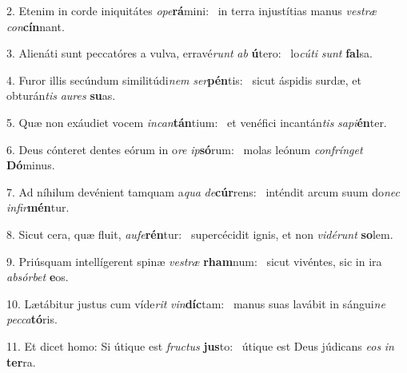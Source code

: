 2. Etenim in corde iniquitátes \textit{o}\textit{pe}\textbf{rá}mini: \ast\  in terra injustítias manus \textit{ves}\textit{træ} \textit{con}\textbf{cín}nant.\

3. Alienáti sunt peccatóres a vulva, erravé\textit{runt} \textit{ab} \textbf{ú}tero: \ast\  lo\textit{cú}\textit{ti} \textit{sunt} \textbf{fal}sa.\

4. Furor illis secúndum similitúdi\textit{nem} \textit{ser}\textbf{pén}tis: \ast\  sicut áspidis surdæ, et obturán\textit{tis} \textit{au}\textit{res} \textbf{su}as.\

5. Quæ non exáudiet vocem \textit{in}\textit{can}\textbf{tán}tium: \ast\  et venéfici incantán\textit{tis} \textit{sa}\textit{pi}\textbf{én}ter.\

6. Deus cónteret dentes eórum in o\textit{re} \textit{ip}\textbf{só}rum: \ast\  molas leónum \textit{con}\textit{frín}\textit{get} \textbf{Dó}minus.\

7. Ad níhilum devénient tamquam a\textit{qua} \textit{de}\textbf{cúr}rens: \ast\  inténdit arcum suum do\textit{nec} \textit{in}\textit{fir}\textbf{mén}tur.\

8. Sicut cera, quæ fluit, \textit{au}\textit{fe}\textbf{rén}tur: \ast\  supercécidit ignis, et non \textit{vi}\textit{dé}\textit{runt} \textbf{so}lem.\

9. Priúsquam intellígerent spinæ \textit{ves}\textit{træ} \textbf{rham}num: \ast\  sicut vivéntes, sic in ira \textit{ab}\textit{sór}\textit{bet} \textbf{e}os.\

10. Lætábitur justus cum víde\textit{rit} \textit{vin}\textbf{díc}tam: \ast\  manus suas lavábit in sángui\textit{ne} \textit{pec}\textit{ca}\textbf{tó}ris.\

11. Et dicet homo: Si útique est \textit{fruc}\textit{tus} \textbf{jus}to: \ast\  útique est Deus júdicans \textit{e}\textit{os} \textit{in} \textbf{ter}ra.\

